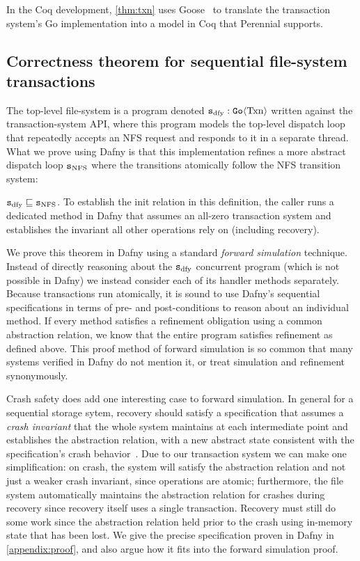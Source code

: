 In the Coq development, \autoref{thm:txn} uses Goose~\cite{chajed:goose-coqpl}
to translate the transaction system's Go implementation into a model in Coq that
Perennial supports.

\subsection{Correctness theorem for sequential file-system transactions}
\label{sec:proof:dafny}

The top-level file-system is a program denoted $\texttt{s}_{\mathrm{dfy}} : \mathtt{Go}\langle \mathrm{Txn} \rangle$
written against the transaction-system API, where this program models the
top-level dispatch loop that repeatedly accepts an NFS request and responds to
it in a separate thread. What we prove using Dafny is that this implementation
refines a more abstract dispatch loop $\texttt{s}_{\mathrm{NFS}}$ where the transitions atomically
follow the NFS transition system:

\begin{theorem}
  $\texttt{s}_{\mathrm{dfy}} \sqsubseteq \texttt{s}_{\mathrm{NFS}}$. To establish the init relation in this definition,
  the caller runs a dedicated method in Dafny that assumes an all-zero
  transaction system and establishes the invariant all other operations rely on
  (including recovery).
  \label{thm:dafny}
\end{theorem}

We prove this theorem in Dafny using a standard \emph{forward simulation}
technique.  Instead of directly reasoning about the $\texttt{s}_{\mathrm{dfy}}$ concurrent program
(which is not possible in Dafny) we instead consider each of its handler methods
separately. Because transactions run atomically, it is sound to use Dafny's
sequential specifications in terms of pre- and post-conditions to reason about
an individual method. If every method satisfies a refinement obligation using a
common abstraction relation, we know that the entire program satisfies
refinement as defined above. This proof method of forward simulation is
so common that many systems verified in Dafny do not mention it, or treat
simulation and refinement synonymously.

Crash safety does add one interesting case to forward simulation. In general for
a sequential storage sytem, recovery should satisfy a specification that assumes
a \emph{crash invariant} that the whole system maintains at each intermediate
point and establishes the abstraction relation, with a new abstract state
consistent with the specification's crash behavior~\cite{chajed:argosy}. Due to
our transaction system we can make one simplification: on crash, the system will
satisfy the abstraction relation and not just a weaker crash invariant, since
operations are atomic; furthermore, the file system automatically maintains the
abstraction relation for crashes during recovery since recovery itself uses a
single transaction. Recovery must still do some work since the abstraction
relation held prior to the crash using in-memory state that has been lost. We
give the precise specification proven in Dafny in \autoref{appendix:proof}, and
also argue how it fits into the forward simulation proof.

